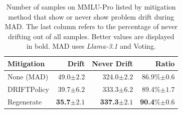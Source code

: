 \begin{table}[t]
\centering
\small
\begin{tabular}{l|rr|r}
\toprule
\textbf{Mitigation} & \textbf{Drift}  & \textbf{Never Drift} & \textbf{Ratio} \\
\midrule
None (MAD) & 49.0\tiny{$\pm 2.2$} & 324.0\tiny{$\pm 2.2$} & 86.9\%\tiny{$\pm 0.6$} \\
DRIFTPolicy & 39.7\tiny{$\pm 6.2$} & 333.3\tiny{$\pm 6.2$} & 89.4\%\tiny{$\pm 1.7$} \\ 
Regenerate & \textbf{35.7\tiny{$\pm 2.1$}} & \textbf{337.3\tiny{$\pm 2.1$}} & \textbf{90.4}\%\tiny{$\pm 0.6$} \\
\bottomrule
\end{tabular}
\caption{Number of samples on MMLU-Pro listed by mitigation method that show or never show problem drift during MAD. The last column refers to the percentage of never drifting out of all samples. Better values are displayed in bold. MAD uses \textit{Llama-3.1} and Voting. \vspace{-0.75cm}}
\label{tab:successful_samples}
\end{table}
